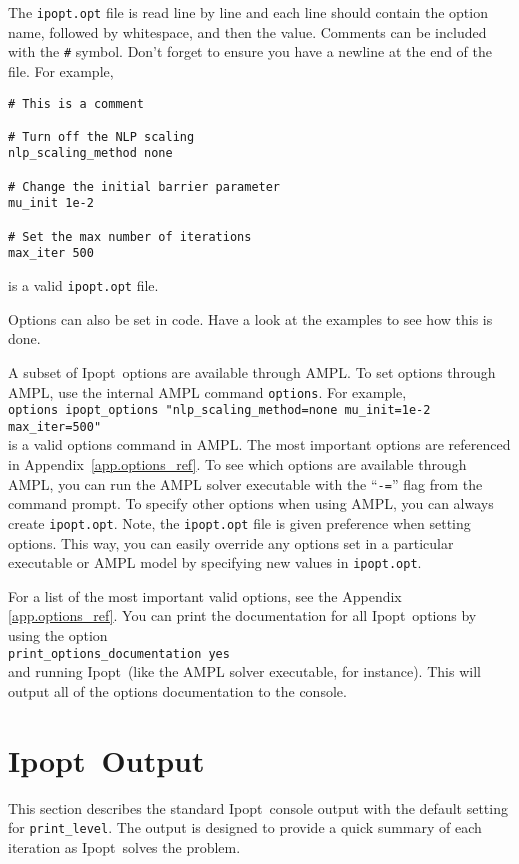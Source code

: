 \documentclass[10pt]{article}
\newcommand{\Ipopt}{{\sc Ipopt}}
\begin{document}
The {\tt ipopt.opt} file is read line by line and each line should
contain the option name, followed by whitespace, and then the
value. Comments can be included with the {\tt \#} symbol. Don't forget
to ensure you have a newline at the end of the file. For example,
\begin{verbatim}
# This is a comment

# Turn off the NLP scaling
nlp_scaling_method none

# Change the initial barrier parameter
mu_init 1e-2

# Set the max number of iterations
max_iter 500
\end{verbatim}
is a valid {\tt ipopt.opt} file.

Options can also be set in code. Have a look at the examples to see
how this is done. 

A subset of \Ipopt\ options are available through AMPL. To set options
through AMPL, use the internal AMPL command {\tt options}.  For
example, \\
{\tt options ipopt\_options "nlp\_scaling\_method=none mu\_init=1e-2
  max\_iter=500"} \\
is a valid options command in AMPL. The most important options are
referenced in Appendix~\ref{app.options_ref}. To see which options are
available through AMPL, you can run the AMPL solver executable with
the ``{\tt -=}'' flag from the command prompt.  To specify other
options when using AMPL, you can always create {\tt ipopt.opt}.  Note,
the {\tt ipopt.opt} file is given preference when setting options.
This way, you can easily override any options set in a particular
executable or AMPL model by specifying new values in {\tt ipopt.opt}.

For a list of the most important valid options, see the Appendix
\ref{app.options_ref}. You can print the documentation for all \Ipopt\
options by using the option \\

{\tt print\_options\_documentation yes} \\

and running \Ipopt\ (like the AMPL solver executable, for
instance). This will output all of the options documentation to the
console.

\section{\Ipopt\ Output}\label{sec:output}
This section describes the standard \Ipopt\ console output with the
default setting for {\tt print\_level}. The output is designed to
provide a quick summary of each iteration as \Ipopt\ solves the problem.
\end{document}
